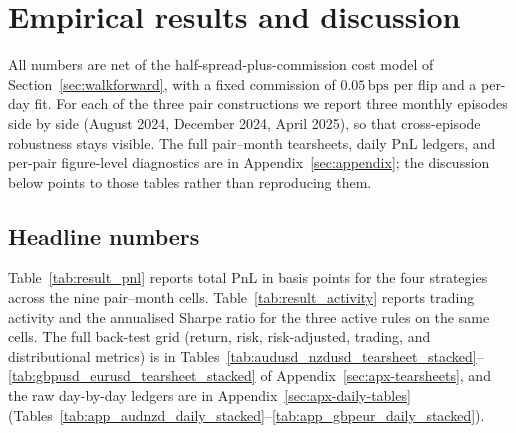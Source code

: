 \section{Empirical results and discussion}\label{sec:result}

All numbers are net of the half-spread-plus-commission cost model of Section~\ref{sec:walkforward}, with a fixed commission of $0.05\,\text{bps}$ per flip and a per-day fit. For each of the three pair constructions we report three monthly episodes side by side (August 2024, December 2024, April 2025), so that cross-episode robustness stays visible. The full pair--month tearsheets, daily PnL ledgers, and per-pair figure-level diagnostics are in Appendix~\ref{sec:appendix}; the discussion below points to those tables rather than reproducing them.

\subsection{Headline numbers}\label{sec:result-headline}

Table~\ref{tab:result_pnl} reports total PnL in basis points for the four strategies across the nine pair--month cells. Table~\ref{tab:result_activity} reports trading activity and the annualised Sharpe ratio for the three active rules on the same cells. The full back-test grid (return, risk, risk-adjusted, trading, and distributional metrics) is in Tables~\ref{tab:audusd_nzdusd_tearsheet_stacked}--\ref{tab:gbpusd_eurusd_tearsheet_stacked} of Appendix~\ref{sec:apx-tearsheets}, and the raw day-by-day ledgers are in Appendix~\ref{sec:apx-daily-tables} (Tables~\ref{tab:app_audnzd_daily_stacked}--\ref{tab:app_gbpeur_daily_stacked}).

